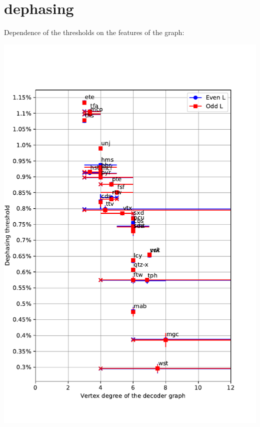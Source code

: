 \documentclass[pra]{revtex4-1}
\begin{document}
\section*{dephasing}
\begin{center}
\noindent Dependence of the thresholds on the features of the graph: 
  
\includegraphics[width=.8\textwidth]{../graphs-paper2/thresholds-dephasing-decoder.pdf}


\end{center}
\end{document}
